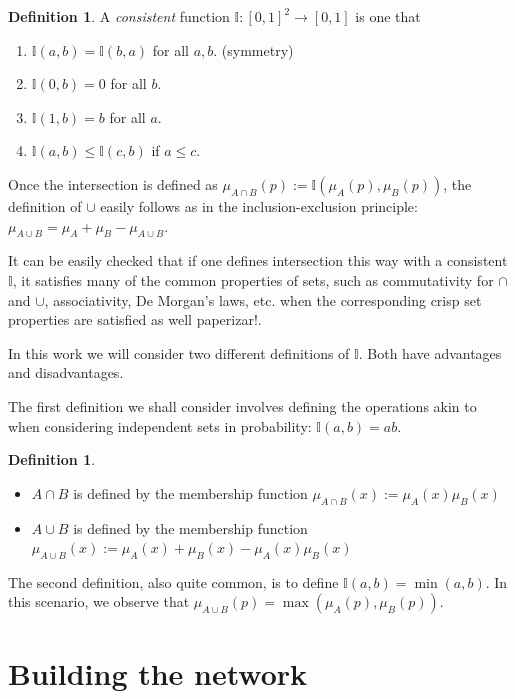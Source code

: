 \documentclass[12pt]{article}
\numberwithin{equation}{section} %
\numberwithin{figure}{section} %
\def\II{{\mathbb{I}}}
\theoremstyle{definition}
\newtheorem{definition}[theorem]{Definition}
\def\tcr#1{\textcolor{MyRed}{#1}}
\begin{document}
\begin{definition}
A \emph{consistent} function $\II : [0,1]^2 \to [0,1]$ is one that
\begin{enumerate}
  \item $\II(a,b) = \II(b,a)$ for all $a,b$. (symmetry)
  \item $\II(0,b) = 0$ for all $b$.
  \item $\II(1,b) = b$ for all $a$.
  \item $\II(a,b) \leq \II(c,b)$ if $a \leq c$.
\end{enumerate}
\end{definition}

Once the intersection is defined as $\mu_{A\cap B}(p) := \II(\mu_A(p),\mu_B(p))$, the definition of $\cup$ easily follows as in the inclusion-exclusion principle: $\mu_{A\cup B} = \mu_A + \mu_B - \mu_{A\cup B}$.

It can be easily checked that if one defines intersection this way with a consistent $\II$, it satisfies many of the common properties of sets, such as commutativity for $\cap$ and $\cup$, associativity, De Morgan's laws, etc. when the corresponding crisp set properties are satisfied as well \tcr{paperizar!}.



In this work we will consider two different definitions of $\II$. Both have advantages and disadvantages. 

The first definition we shall consider involves defining the operations akin to when considering independent sets in probability: $\II(a,b) = ab$.

\begin{definition}
	\begin{itemize}
		\item $A\cap B$ is defined by the membership function $\mu_{A\cap B} (x) := \mu_A(x)\mu_B(x)$
		\item $A\cup B$ is defined by the membership function $\mu_{A\cup B} (x) := \mu_A(x)+\mu_B(x)-\mu_A(x)\mu_B(x)$
	\end{itemize}
\end{definition}

The second definition, also quite common, is to define $\II(a,b) = \min(a,b)$. In this scenario, we observe that $\mu_{A\cup B}(p) = \max(\mu_A(p),\mu_B(p))$.

\section{Building the network}
\end{document}
